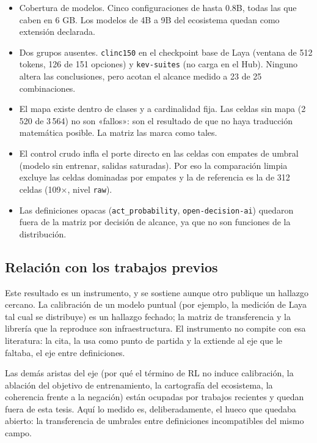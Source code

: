 \begin{itemize}
\item Cobertura de modelos. Cinco configuraciones de hasta 0.8B, todas las que caben en 6 GB. Los modelos de 4B a 9B del ecosistema quedan como extensión declarada.
\item Dos grupos ausentes. \texttt{clinc150} en el checkpoint base de Laya (ventana de 512 tokens, 126 de 151 opciones) y \texttt{kev-suites} (no carga en el Hub). Ninguno altera las conclusiones, pero acotan el alcance medido a 23 de 25 combinaciones.
\item El mapa existe dentro de clases y a cardinalidad fija. Las celdas sin mapa (2\,520 de 3\,564) no son «fallos»: son el resultado de que no haya traducción matemática posible. La matriz las marca como tales.
\item El control crudo infla el porte directo en las celdas con empates de umbral (modelo sin entrenar, salidas saturadas). Por eso la comparación limpia excluye las celdas dominadas por empates y la de referencia es la de 312 celdas (109$\times$, nivel \texttt{raw}).
\item Las definiciones opacas (\texttt{act\_probability}, \texttt{open-decision-ai}) quedaron fuera de la matriz por decisión de alcance, ya que no son funciones de la distribución.
\end{itemize}

\subsection{Relación con los trabajos previos}

Este resultado es un instrumento, y se sostiene aunque otro publique un hallazgo cercano. La calibración de un modelo puntual (por ejemplo, la medición de Laya tal cual se distribuye) es un hallazgo fechado; la matriz de transferencia y la librería que la reproduce son infraestructura. El instrumento no compite con esa literatura: la cita, la usa como punto de partida y la extiende al eje que le faltaba, el eje entre definiciones.

Las demás aristas del eje (por qué el término de RL no induce calibración, la ablación del objetivo de entrenamiento, la cartografía del ecosistema, la coherencia frente a la negación) están ocupadas por trabajos recientes y quedan fuera de esta tesis. Aquí lo medido es, deliberadamente, el hueco que quedaba abierto: la transferencia de umbrales entre definiciones incompatibles del mismo campo.
